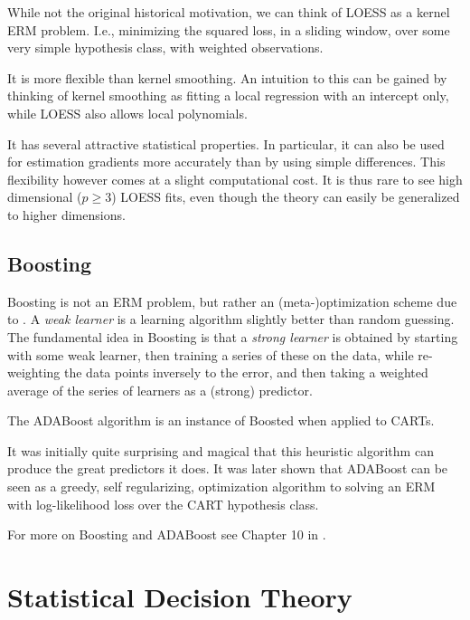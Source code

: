 \documentclass[12pt,a4paper]{article}
\theoremstyle{plain}
\theoremstyle{definition}
\begin{document}
While not the original historical motivation, we can think of LOESS as a kernel ERM problem. 
I.e., minimizing the squared loss, in a sliding window, over some very simple hypothesis class, with weighted observations.

It is more flexible than kernel smoothing.
An intuition to this can be gained by thinking of kernel smoothing as fitting a local regression with an intercept only, while LOESS also allows local polynomials.

It has several attractive statistical properties. In particular, it can also be used for estimation gradients more accurately than by using simple differences. 
This flexibility however comes at a slight computational cost. 
It is thus rare to see high dimensional ($p \geq 3$) LOESS fits, even though the theory can easily be generalized to higher dimensions.




\subsection{Boosting}
\label{sec:boosting}

Boosting is not an ERM problem, but rather an (meta-)optimization scheme due to \cite{schapire_strength_1990}.
A \emph{weak learner} is a learning algorithm slightly better than random guessing. 
The fundamental idea in Boosting is that a \emph{strong learner} is obtained by starting with some weak learner, then training a series of these on the data, while re-weighting the data points inversely to the error, and then taking a weighted average of the series of learners as a (strong) predictor.

The ADABoost algorithm \citep{freund_decision-theoretic_1997} is an instance of Boosted when applied to CARTs.

It was initially quite surprising and magical that this heuristic algorithm can produce the great predictors it does. 
It was later shown that ADABoost can be seen as a greedy, self regularizing, optimization algorithm to solving an ERM with log-likelihood loss \citep{friedman_additive_2000} over the CART hypothesis class.

For more on Boosting and ADABoost see Chapter 10 in \cite{hastie_elements_2003}.





\section{Statistical Decision Theory}
\label{sec:desicion_theory}
\end{document}
